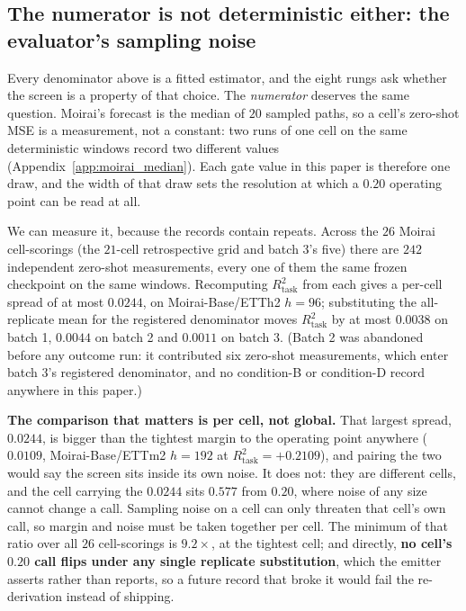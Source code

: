 \subsection{The numerator is not deterministic either: the evaluator's sampling noise}
\label{app:zsnoise}

Every denominator above is a fitted estimator, and the eight rungs ask whether the
screen is a property of that choice.  The \emph{numerator} deserves the same
question.  Moirai's forecast is the median of $20$ sampled paths, so a cell's
zero-shot MSE is a measurement, not a
constant: two runs of one cell on the same deterministic windows record two
different values (Appendix~\ref{app:moirai_median}).  Each gate value in this paper
is therefore one draw, and the width of that draw sets the resolution at which a
$0.20$ operating point can be read at all.

We can measure it, because the records contain repeats.  Across the $26$ Moirai
cell-scorings (the $21$-cell retrospective grid and batch 3's five) there are
$242$ independent zero-shot measurements, every one of them the same frozen
checkpoint on the same windows.  Recomputing $R^2_\text{task}$ from each gives a
per-cell spread of at most $0.0244$, on Moirai-Base/ETTh2 $h{=}96$; substituting
the all-replicate mean for the registered denominator moves $R^2_\text{task}$ by at
most $0.0038$ on batch 1, $0.0044$ on batch 2 and $0.0011$ on batch 3.
(Batch 2 was abandoned before any outcome run: it contributed six zero-shot
measurements, which enter batch 3's registered denominator, and no condition-B or
condition-D record anywhere in this paper.)

\textbf{The comparison that matters is per cell, not global.}  That largest spread,
$0.0244$, is bigger than the tightest margin to the operating point anywhere
($0.0109$, Moirai-Base/ETTm2 $h{=}192$ at $R^2_\text{task}{=}{+}0.2109$), and
pairing the two would say the screen sits inside its own noise.  It does not: they
are different cells, and the cell carrying the $0.0244$ sits $0.577$ from $0.20$,
where noise of any size cannot change a call.  Sampling noise on a cell can only
threaten that cell's own call, so margin and noise must be taken together per cell.
The minimum of that ratio over all $26$ cell-scorings is $9.2\times$, at the
tightest cell; and directly, \textbf{no cell's $0.20$ call flips under any single
replicate substitution}, which the emitter asserts rather than reports, so a
future record that broke it would fail the re-derivation instead of shipping.

